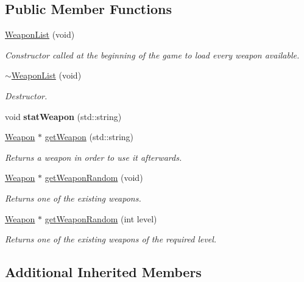 \subsection*{Public Member Functions}
\begin{DoxyCompactItemize}
\item 
\hyperlink{class_weapon_list_ac3a994cd2844ac00fcf09011f4209f48}{Weapon\+List} (void)
\begin{DoxyCompactList}\small\item\em Constructor called at the beginning of the game to load every weapon available. \end{DoxyCompactList}\item 
\hyperlink{class_weapon_list_a44f72440d8a4586b19e4b60d308b2e51}{$\sim$\+Weapon\+List} (void)
\begin{DoxyCompactList}\small\item\em Destructor. \end{DoxyCompactList}\item 
\hypertarget{class_weapon_list_ad39bd93b72f73eb7e69388dd5d4bfac2}{void {\bfseries stat\+Weapon} (std\+::string)}\label{class_weapon_list_ad39bd93b72f73eb7e69388dd5d4bfac2}

\item 
\hyperlink{class_weapon}{Weapon} $\ast$ \hyperlink{class_weapon_list_a97b9173cefa20573ed27d52d58d1292e}{get\+Weapon} (std\+::string)
\begin{DoxyCompactList}\small\item\em Returns a weapon in order to use it afterwards. \end{DoxyCompactList}\item 
\hyperlink{class_weapon}{Weapon} $\ast$ \hyperlink{class_weapon_list_aee801adca4fe1154993eedc6c71b3dca}{get\+Weapon\+Random} (void)
\begin{DoxyCompactList}\small\item\em Returns one of the existing weapons. \end{DoxyCompactList}\item 
\hyperlink{class_weapon}{Weapon} $\ast$ \hyperlink{class_weapon_list_a80b1e46c7e1fa0e6be725fe8d13ed93d}{get\+Weapon\+Random} (int level)
\begin{DoxyCompactList}\small\item\em Returns one of the existing weapons of the required level. \end{DoxyCompactList}\end{DoxyCompactItemize}
\subsection*{Additional Inherited Members}


